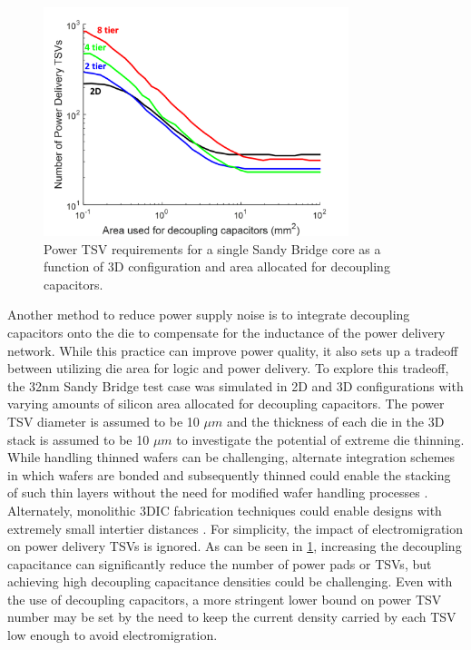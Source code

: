 \documentclass[journal,twoside]{IEEEtran}
\newcommand{\changed}[1]{\textcolor{red}{#1}}
\newcommand{\rechanged}[1]{\textcolor{red}{#1}}
\renewcommand{\rechanged}[1]{#1} %
\renewcommand{\changed}[1]{#1} %
\begin{document}
\begin{figure}[tb]
	\centering
	\includegraphics[width=3.5in]{Figures/sb3d_psn_tiers_and_decap__substrate_10um__tsvs_10um_3.png}
	\caption{
		Power TSV requirements for a single Sandy Bridge core as a function of 3D configuration and
		area allocated for decoupling capacitors.
		}
	\label{f-sb-psn-decap-10um}
\end{figure}

Another method to reduce power supply noise is to integrate decoupling capacitors onto the die
to compensate for the inductance of the power delivery network. While this practice can improve
power quality, it also sets up a tradeoff between utilizing die area for logic and power delivery.
To explore this tradeoff, the 32nm Sandy Bridge test case was simulated in 2D and 3D configurations with
varying amounts of silicon area allocated for decoupling capacitors. The power TSV diameter is assumed to be 10 ${\mu}m$ and the thickness of each die in the 3D stack is assumed to be
10 ${\mu}m$ \changed{to investigate the potential of extreme die thinning. While handling thinned wafers can be challenging,
alternate integration schemes in which wafers are bonded and subsequently thinned could enable the stacking of such thin layers
without the need for modified wafer handling processes \cite{patti-three-dimensional-2006}. Alternately, monolithic 3DIC fabrication
techniques could enable designs with extremely small intertier distances \cite{vinet-monolithic-2014}.}
\rechanged{For simplicity, the impact of electromigration on power delivery TSVs is ignored.} As can be seen in \cref{f-sb-psn-decap-10um}, increasing the decoupling
capacitance can significantly reduce the number of power pads or TSVs, but achieving high decoupling capacitance densities could be challenging. 
\rechanged{Even with the use of decoupling capacitors, a more stringent lower bound on power TSV number may be set by
the need to keep the current density carried by each TSV low enough to avoid electromigration.}
\end{document}
